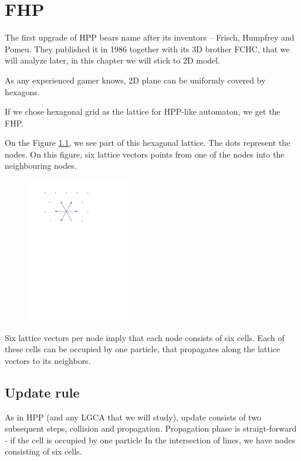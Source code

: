 \chapter{FHP}
The first upgrade of HPP bears name after its inventors -- Frisch, Humpfrey and Pomeu. 
They published it in 1986 together with its 3D brother FCHC, that we will analyze later, in this chapter we will stick to 2D model.


As any experienced gamer knows, 2D plane can be uniformly covered by hexagons.

If we chose hexagonal grid as the lattice for HPP-like automaton, we get the FHP.

On the Figure \ref{FHPgrid}, we see part of this hexagonal lattice. The dots represent the nodes.
On this figure, six lattice vectors points from one of the nodes into the neighbouring nodes.
\begin{figure}[htbp] \label{FHPgrid}
 \centering
 \includegraphics[width=0.4\textwidth]{./img/fhp-desc}
 
\end{figure}

Six lattice vectors per node imply that each node consists of six cells. Each of these cells can be occupied by one particle, that propagates along the lattice vectors to its neighbors.

\section{Update rule}
As in HPP (and any LGCA that we will study), update consists of two subsequent steps, collision and propagation.
Propagation phase is straigt-forward - if the cell is occupied by one particle
In the intersection of lines, we have nodes consisting of six cells.\\

